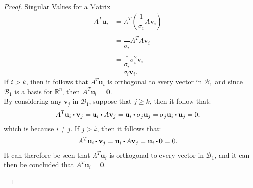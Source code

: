 \begin{proof}{Singular Values for a Matrix}
    \begin{align*}
        A^T\mathbf{u}_i &= A^T \left(\dfrac{1}{\sigma_i}A\mathbf{v}_i \right)\\
        &= \dfrac{1}{\sigma_i}A^TA\mathbf{v}_i\\
        &= \dfrac{1}{\sigma_i}\sigma_i^2\mathbf{v}_i\\
        &=\sigma_i\mathbf{v}_i.
    \end{align*}
    If $i>k$, then it follows that $A^T\mathbf{u}_i$ is orthogonal to every vector in $\mathcal{B}_1$ and since $\mathcal{B}_1$ is a basis for $\mathbb{R}^n$, then $A^T\mathbf{u}_i=\mathbf{0}$. \\ By considering any $\mathbf{v}_j$ in $\mathcal{B}_1$, suppose that $j\geq k$, then it follow that: 
    \begin{align*}
        A^T\mathbf{u}_i \vprik \mathbf{v}_j = \mathbf{u}_i \vprik A\mathbf{v}_j = \mathbf{u}_i \vprik \sigma_j\mathbf{u}_j = \sigma_j\mathbf{u}_i \vprik \mathbf{u}_j =0,
    \end{align*}
    which is because $i\neq j$. If $j>k$, then it follows that:
    \begin{align*}
        A^T\mathbf{u}_i \vprik \mathbf{v}_j = \mathbf{u}_i \vprik A\mathbf{v}_j= \mathbf{u}_i \vprik \mathbf{0}=0.
    \end{align*}
    It can therefore be seen that $A^T\mathbf{u}_i$ is orthogonal to every vector in $\mathcal{B}_1$, and it can then be concluded that $A^T\mathbf{u}_i = \mathbf{0}$.
    \qedsymbol


\noindent\cite[439-440]{LiAl}
\end{proof}



